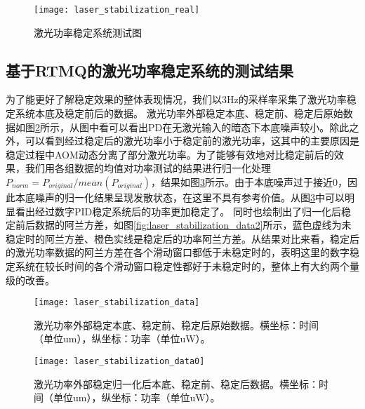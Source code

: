 \begin{figure}
    \centering
    \caption[激光功率稳定系统测试图]{激光功率稳定系统测试图\label{fig:laser_stabilization_real}}
    \texttt{[image: laser\_stabilization\_real]}
\end{figure}


\subsection[基于RTMQ的激光功率稳定系统的测试结果]{基于RTMQ的激光功率稳定系统的测试结果}

为了能更好了解稳定效果的整体表现情况，我们以3Hz的采样率采集了激光功率稳定系统本底及稳定前后的数据。
激光功率外部稳定本底、稳定前、稳定后原始数据如图\ref{fig:laser_stabilization_data}所示，从图中看可以看出PD在无激光输入的暗态下本底噪声较小。除此之外，可以看到经过稳定后的激光功率小于稳定前的激光功率，这其中的主要原因是稳定过程中AOM动态分离了部分激光功率。为了能够有效地对比稳定前后的效果，我们用各组数据的均值对功率测试的结果进行归一化处理$P_{norm}=P_{original}/mean(P_{original})$，结果如图\ref{fig:laser_stabilization_data0}所示。由于本底噪声过于接近0，因此本底噪声的归一化结果呈现发散状态，在这里不具有参考价值。从图\ref{fig:laser_stabilization_data0}中可以明显看出经过数字PID稳定系统后的功率更加稳定了。
同时也绘制出了归一化后稳定前后数据的阿兰方差，如图\ref{fig:laser_stabilization_data2}所示，蓝色虚线为未稳定时的阿兰方差、橙色实线是稳定后的功率阿兰方差。从结果对比来看，稳定后的激光功率数据的阿兰方差在各个滑动窗口都低于未稳定时的，表明这里的数字稳定系统在较长时间的各个滑动窗口稳定性都好于未稳定时的，整体上有大约两个量级的改善。

\begin{figure}
    \centering
    \caption[激光功率外部稳定原始数据]{激光功率外部稳定本底、稳定前、稳定后原始数据。横坐标：时间（单位um），纵坐标：功率（单位uW）。\label{fig:laser_stabilization_data}}
    \texttt{[image: laser\_stabilization\_data]}
\end{figure}

\begin{figure}
    \centering
    \caption[激光功率外部稳定归一化后数据]{激光功率外部稳定归一化后本底、稳定前、稳定后数据。横坐标：时间（单位um），纵坐标：功率（单位uW）。\label{fig:laser_stabilization_data0}}
    \texttt{[image: laser\_stabilization\_data0]}
\end{figure}

